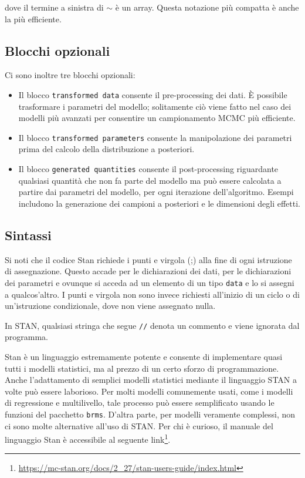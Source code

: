 \documentclass[
  11pt,
]{krantz}
\providecommand{\tightlist}{%
  \setlength{\itemsep}{0pt}\setlength{\parskip}{0pt}}
\renewcommand{\href}[2]{#2\footnote{\url{#1}}}
\theoremstyle{definition}
\theoremstyle{definition}
\theoremstyle{definition}
\theoremstyle{definition}
\theoremstyle{remark}
\begin{document}
dove il termine a sinistra di \(\sim\) è un array. Questa notazione più compatta è anche la più efficiente.

\hypertarget{blocchi-opzionali}{%
\subsection{Blocchi opzionali}\label{blocchi-opzionali}}

Ci sono inoltre tre blocchi opzionali:

\begin{itemize}
\tightlist
\item
  Il blocco \texttt{transformed\ data} consente il pre-processing dei dati. È possibile trasformare i parametri del modello; solitamente ciò viene fatto nel caso dei modelli più avanzati per consentire un campionamento MCMC più efficiente.
\item
  Il blocco \texttt{transformed\ parameters} consente la manipolazione dei parametri prima del calcolo della distribuzione a posteriori.
\item
  Il blocco \texttt{generated\ quantities} consente il post-processing riguardante qualsiasi quantità che non fa parte del modello ma può essere calcolata a partire dai parametri del modello, per ogni iterazione dell'algoritmo. Esempi includono la generazione dei campioni a posteriori e le dimensioni degli effetti.
\end{itemize}

\hypertarget{sintassi}{%
\subsection{Sintassi}\label{sintassi}}

Si noti che il codice Stan richiede i punti e virgola (;) alla fine di ogni istruzione di assegnazione. Questo accade per le dichiarazioni dei dati, per le dichiarazioni dei parametri e ovunque si acceda ad un elemento di un tipo \texttt{data} e lo si assegni a qualcos'altro. I punti e virgola non sono invece richiesti all'inizio di un ciclo o di un'istruzione condizionale, dove non viene assegnato nulla.

In STAN, qualsiasi stringa che segue \texttt{//} denota un commento e viene ignorata dal programma.

Stan è un linguaggio estremamente potente e consente di implementare quasi tutti i modelli statistici, ma al prezzo di un certo sforzo di programmazione. Anche l'adattamento di semplici modelli statistici mediante il linguaggio STAN a volte può essere laborioso. Per molti modelli comunemente usati, come i modelli di regressione e multilivello, tale processo può essere semplificato usando le funzioni del pacchetto \texttt{brms}. D'altra parte, per modelli veramente complessi, non ci sono molte alternative all'uso di STAN. Per chi è curioso, il manuale del linguaggio Stan è accessibile al seguente \href{https://mc-stan.org/docs/2_27/stan-users-guide/index.html}{link}.
\end{document}
